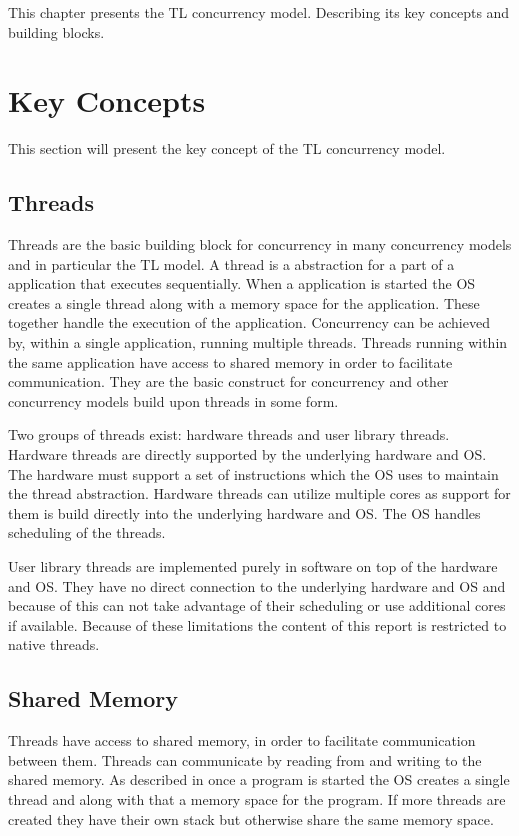 \makeatletter {}\makeatother
{}
This chapter presents the \ac{TL} concurrency model. Describing its key concepts and building blocks. 
\label{chap:threads_locks}
\section{Key Concepts}
This section will present the key concept of the \ac{TL} concurrency model. 
\subsection{Threads}\label{subsec:threads}
Threads are the basic building block for concurrency in many concurrency models and in particular the \ac{TL} model. A thread is a abstraction for a part of a application that executes sequentially. When a application is started the \ac{OS} creates a single thread along with a memory space for the application. These together handle the execution of the application. Concurrency can be achieved by, within a single application, running multiple threads. Threads running within the same application have access to shared memory in order to facilitate communication. They are the basic construct for concurrency and other concurrency models build upon threads in some form.

Two groups of threads exist: hardware threads and user library threads. Hardware threads are directly supported by the underlying hardware and \ac{OS}. The hardware must support a set of instructions which the \ac{OS} uses to maintain the thread abstraction. Hardware threads can utilize multiple cores as support for them is build directly into the underlying hardware and \ac{OS}. The \ac{OS} handles scheduling of the threads.

User library threads are implemented purely in software on top of the hardware and \ac{OS}. They have no direct connection to the underlying hardware and \ac{OS} and because of this can not take advantage of their scheduling or use additional cores if available. Because of these limitations the content of this report is restricted to native threads.

\subsection{Shared Memory}\label{sub:sec:shared_memory}
Threads have access to shared memory, in order to facilitate communication between them\cite[p. 93]{tanenbaum2008modern}. Threads can communicate by reading from and writing to the shared memory. As described in  once a program is started the \ac{OS} creates a single thread and along with that a memory space for the program. If more threads are created they have their own stack but otherwise share the same memory space.

